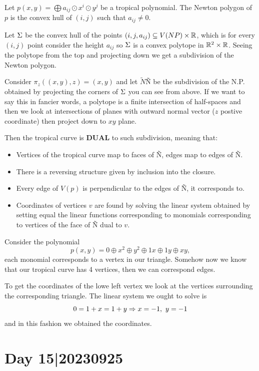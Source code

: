 \documentclass[12pt]{memoir}
\theoremstyle{definition}
\begin{document}
Let $p(x,y)=\bigoplus a_{ij}\odot x^i\odot y^j$ be a tropical polynomial. The Newton polygon of $p$ is the convex hull of $(i,j)$ such that $a_{ij}\neq 0$.\par 
Let $\Sigma$ be the convex hull of the points $(i,j,a_{ij})\subseteq V(NP)\times\mathbb{R}$, which is for every $(i,j)$ point consider the height $a_{ij}$ so $\Sigma$ is a convex polytope in $\mathbb{R}^2\times\mathbb{R}$. Seeing the polytope from the top and projecting down we get a subdivision of the Newton polygon.\par 
Consider $\pi_z((x,y),z)=(x,y)$ and let $\tilde{N}$\~N be the subdivision of the N.P. obtained by projecting the corners of $\Sigma$ you can see from above.
If we want to say this in fancier words, a polytope is a finite intersection of half-spaces and then we look at intersections of planes with outward normal vector ($z$ postive coordinate) then project down to $xy$ plane.\par 
Then the tropical curve is \textbf{DUAL} to such subdivision, meaning that:
\begin{itemize}
    \item Vertices of the tropical curve map to faces of \~N, edges map to edges of \~N.
    \item There is a reversing structure given by inclusion into the closure.
    \item Every edge of $V(p)$ is perpendicular to the edges of \~N, it corresponds to.
    \item Coordinates of vertices $v$ are found by solving the linear system obtained by setting equal the linear functions corresponding to monomials corresponding to vertices of the face of \~N dual to $v$.
\end{itemize}

\begin{Ex}
    Consider the polynomial
    $$p(x,y)=0\oplus x^2\oplus y^2\oplus 1x\oplus 1y\oplus xy,$$
    each monomial corresponds to a vertex in our triangle. Somehow now we know that our tropical curve has 4 vertices, then we can correspond edges.\par 
    To get the coordinates of the lowe left vertex we look at the vertices surrounding the corresponding triangle. The linear system we ought to solve is 
    $$0=1+x=1+y\To x=-1,\ y=-1$$
    and in this fashion we obtained the coordinates. 
\end{Ex}

\section{Day 15|20230925}
\end{document}
